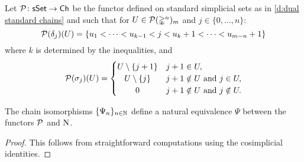 \iffalse
\begin{proof}
	It can be easily seen that $\Psi_n$ induces a degree preserving bijection of basis elements.
	We will verify that this assignment induces a chain map.
	Let $U = \{u_1 < \cdots < u_{n-m}\} \in \rP_{m-n}^n$.
	Using the relation $d_jd_u = d_ud_{j+1}$ if $u \leq j$ we have
	\begin{align*}
	\bd \Psi_n(U) &=
	\bd d_U[n] =
	\sum_{j=0}^{m} d_j\, d_{u_1} \cdots\, d_{u_{n-m}}[n] \\ &=
	\sum_{\bar u \in \{0, \dots, n\} \setminus U}
	\hspace*{-10pt} d_{u_1} \cdots\, d_{\bar{u}} \cdots\, d_{u_{n-m}}[n] \\ &=
	\sum_{\bar u \in \{0, \dots, n\} \setminus U} d_{\{\bar u\} \union U}[n] \\ &=
	\Psi_n(\bd U),
	\end{align*}
	as claimed.
\end{proof}
\fi

\begin{definition}
	Let $\mathcal{P} \colon \mathsf{sSet} \to \mathsf{Ch}$ be the functor defined on standard simplicial sets as in \cref{d:dual standard chains} and such that for $U \in \mathcal{P}(\mathbb{\Delta}^n)_m$ and $j \in \{0, \dots, n\}$:
	\[
	\mathcal{P}(\delta_j)(U) = \{ u_1 < \dots < u_{k-1} < j < u_k+1 < \dots < u_{m-n}+1 \}
	\]
	where $k$ is determined by the inequalities, and
	\begin{equation} \label{e:action of P on a codegeneracy}
	\cP(\sigma_j)(U) = \begin{cases}
	U \setminus \{j+1\} & j+1 \in U, \\
	\hfil U \setminus \{j\} & j+1 \notin U \text{ and } j \in U, \\
	\hfil 0 & j+1 \notin U \text{ and } j \notin U.
	\end{cases}
	\end{equation}
\end{definition}

\begin{lemma}
	The chain isomorphisms $\{\Psi_n\}_{n \in \mathbb{N}}$ define a natural equivalence $\Psi$ between the functors $\mathcal{P}$ and $\operatorname{N}$.
\end{lemma}

\begin{proof}
	This follows from straightforward computations using the cosimplicial identities.
\end{proof}

